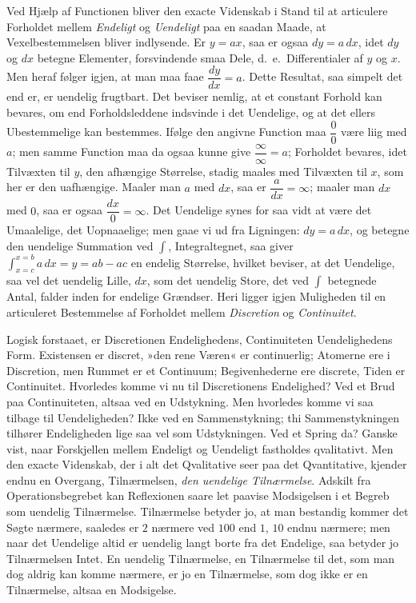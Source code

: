 \documentclass[12pt]{book}
\newcommand{\apage}[1]{\marginnote{\footnotesize\textit{[#1]}}}
\begin{document}
Ved Hjælp af Functionen bliver den exacte Videnskab i Stand til at
articulere Forholdet mellem \emph{Endeligt} og \emph{Uendeligt} paa en saadan Maade, at
Vexelbestemmelsen bliver indlysende. Er $y = ax$, saa er ogsaa $dy = a\,dx$,
idet $dy$ og $dx$ betegne Elementer, forsvindende smaa Dele, d.\ e.\
Differentialer af $y$ og $x$. Men heraf følger igjen, at man maa faae
$\dfrac{dy}{dx} = a$. Dette Resultat, saa simpelt det end er, er uendelig
frugtbart. Det beviser nemlig, at et constant Forhold kan bevares, om end
Forholdsleddene indsvinde i det Uendelige, og at det ellers Ubestemmelige
kan bestemmes. Ifølge den angivne Function maa $\dfrac{0}{0}$ være liig med
$a$; men samme Function maa da ogsaa kunne give $\dfrac{\infty}{\infty} =
a$; Forholdet bevares, idet Tilvæxten til $y$, den afhængige Størrelse,
stadig maales med Tilvæxten til $x$, som her er den uafhængige. Maaler man
$a$ med $dx$, saa er $\dfrac{a}{dx} = \infty$; maaler man $dx$ med $0$, saa
er ogsaa $\dfrac{dx}{0} = \infty$. Det Uendelige synes for saa vidt at være
det Umaalelige, det Uopnaaelige; men gaae \apage{122} vi ud fra Ligningen: $dy = a\,dx$,
og betegne den uendelige Summation ved $\int$, Integraltegnet, saa giver
$\int_{x=c}^{x=b} a\,dx = y = ab - ac$ en endelig Størrelse, hvilket
beviser, at det Uendelige, saa vel det uendelig Lille, $dx$, som det
uendelig Store, det ved $\int$ betegnede Antal, falder inden for endelige
Grændser. Heri ligger igjen Muligheden til en articuleret Bestemmelse af
Forholdet mellem \emph{Discretion} og \emph{Continuitet}.

Logisk forstaaet, er Discretionen Endelighedens, Continuiteten
Uendelighedens Form. Existensen er discret, »den rene Væren« er
continuerlig; Atomerne ere i Discretion, men Rummet er et Continuum;
Begivenhederne ere discrete, Tiden er Continuitet. Hvorledes komme vi nu
til Discretionens Endelighed? Ved et Brud paa Continuiteten, altsaa ved en
Udstykning. Men hvorledes komme vi saa tilbage til Uendeligheden? Ikke ved
en Sammenstykning; thi Sammenstykningen tilhører Endeligheden lige saa vel
som Udstykningen. Ved et Spring da? Ganske vist, naar Forskjellen mellem
Endeligt og Uendeligt fastholdes qvalitativt. Men den exacte Videnskab, der
i alt det Qvalitative seer paa det Qvantitative, kjender endnu en Overgang,
Tilnærmelsen, \emph{den uendelige Tilnærmelse}. Adskilt fra Operationsbegrebet kan
Reflexionen saare let paavise Modsigelsen i et Begreb som uendelig
Tilnærmelse. Tilnærmelse betyder jo, at man bestandig kommer det Søgte
nærmere, saaledes er $2$ nærmere ved $100$ end $1$, $10$ endnu nærmere; men
naar det Uendelige altid er uendelig langt borte fra det  \apage{123} Endelige, saa
betyder jo Tilnærmelsen Intet. En uendelig Tilnærmelse, en Tilnærmelse til
det, som man dog aldrig kan komme nærmere, er jo en Tilnærmelse, som dog
ikke er en Tilnærmelse, altsaa en Modsigelse.
\end{document}
